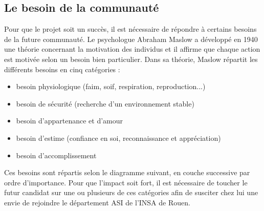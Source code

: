 \subsection{Le besoin de la communauté}

Pour que le projet soit un succès, il est nécessaire de répondre à certains besoins de la future communauté. Le psychologue Abraham Maslow a développé en 1940 une théorie concernant la motivation des individus et il affirme que chaque action est motivée selon un besoin bien particulier.
Dans sa théorie, Maslow répartit les différents besoins en cinq catégories :
\begin{itemize}
	\item besoin physiologique (faim, soif, respiration, reproduction...)
	\item besoin de sécurité (recherche d'un environnement stable)
	\item besoin d'appartenance et d'amour
	\item besoin d'estime (confiance en soi, reconnaissance et appréciation)
	\item besoin d'accomplissement
\end{itemize}

Ces besoins sont répartis selon le diagramme suivant, en couche successive par ordre d'importance. Pour que l'impact soit fort, il est nécessaire de toucher le futur candidat sur une ou plusieurs de ces catégories afin de susciter chez lui une envie de rejoindre le département ASI de l'INSA de Rouen.

